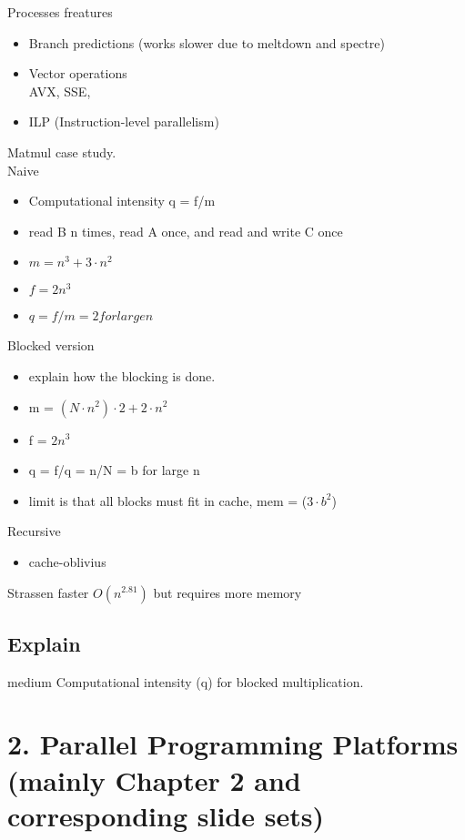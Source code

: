 \documentclass[a4paper,10pt,titlepage]{report}
\begin{document}
Processes freatures
\begin{itemize}
\item   Branch predictions (works slower due to meltdown and spectre)
\item    Vector operations \\
		 		AVX, SSE,
\item    ILP (Instruction-level parallelism)
\end{itemize}

Matmul case study.\\
	Naive\\
    
\begin{itemize}
\item  Computational intensity q = f/m
\item read B n times, read A once, and read and write C once
\item $m = n^3 + 3 \cdot n^2$
\item $f = 2n^3$
\item $q = f/m = 2 for large n$
\end{itemize}
	Blocked version\\
    
\begin{itemize}
\item explain how the blocking is done.
\item m = $(N\cdot n^2)\cdot 2 + 2\cdot n^2$
\item f = $2n^3$
\item q = f/q = n/N = b for large n
\item limit is that all blocks must fit in cache, mem = ($3\cdot b^2$)
\end{itemize}
	Recursive
    
\begin{itemize}
\item cache-oblivius
\end{itemize}

Strassen
	faster $O(n^{2.81})$ but requires more memory
    
\subsection{Explain} 
medium Computational intensity (q) for blocked multiplication.

   
    

    
    
\newpage
\section{
2. Parallel Programming Platforms (mainly Chapter 2 and corresponding slide sets) }
\end{document}
